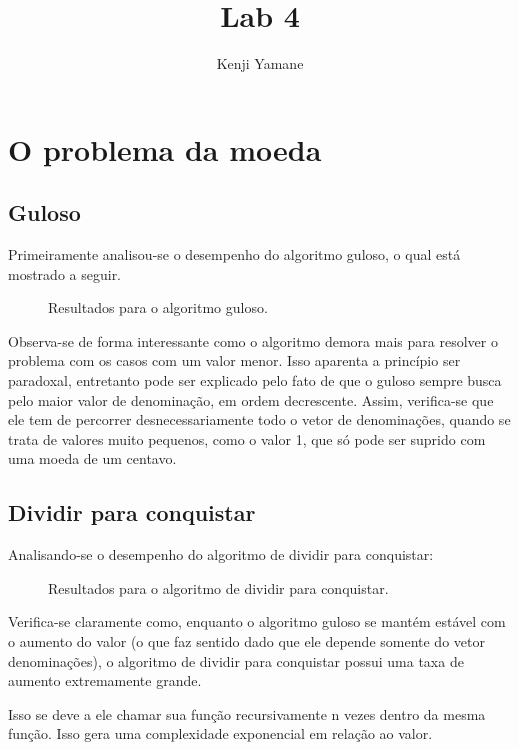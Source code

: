 \documentclass{article}[twocolumn]
\title{Lab 4}
\author{Kenji Yamane}
\begin{document}
	\maketitle
	\section{O problema da moeda}
	\subsection{Guloso}
	Primeiramente analisou-se o desempenho do algoritmo guloso, o qual est\'a mostrado
	a seguir.
	\begin{figure}[H]
		\centering
		\caption{Resultados para o algoritmo guloso.}
	\end{figure}
	Observa-se de forma interessante como o algoritmo demora mais para resolver o problema
	com os casos com um valor menor. Isso aparenta a princ\'ipio ser paradoxal, entretanto
	pode ser explicado pelo fato de que o guloso sempre busca pelo maior valor de denomina\c{c}\~ao,
	em ordem decrescente. Assim, verifica-se que ele tem de percorrer desnecessariamente
	todo o vetor de denomina\c{c}\~oes, quando se trata de valores muito pequenos, como o valor 1,
	que s\'o pode ser suprido com uma moeda de um centavo.

	\subsection{Dividir para conquistar}
	Analisando-se o desempenho do algoritmo de dividir para conquistar:
	\begin{figure}[H]
		\centering
		\caption{Resultados para o algoritmo de dividir para conquistar.}
	\end{figure}
	Verifica-se claramente como, enquanto o algoritmo guloso se mant\'em est\'avel com o aumento
	do valor (o que faz sentido dado que ele depende somente do vetor denomina\c{c}\~oes),
	o algoritmo de dividir para conquistar possui uma taxa de aumento extremamente grande.

	Isso se deve a ele chamar sua fun\c{c}\~ao recursivamente n vezes dentro da mesma fun\c{c}\~ao.
	Isso gera uma complexidade exponencial em rela\c{c}\~ao ao valor.
	
\end{document}
